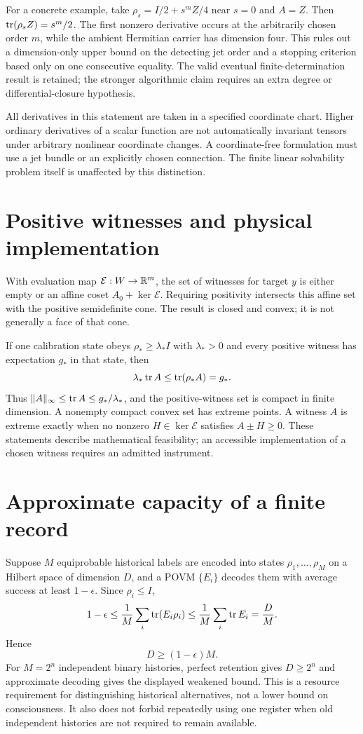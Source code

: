 For a concrete example, take $\rho_s=I/2+s^mZ/4$ near $s=0$ and $A=Z$. Then $\operatorname{tr}(\rho_sZ)=s^m/2$. The first nonzero derivative occurs at the arbitrarily chosen order $m$, while the ambient Hermitian carrier has dimension four. This rules out a dimension-only upper bound on the detecting jet order and a stopping criterion based only on one consecutive equality. The valid eventual finite-determination result is retained; the stronger algorithmic claim requires an extra degree or differential-closure hypothesis.

All derivatives in this statement are taken in a specified coordinate chart. Higher ordinary derivatives of a scalar function are not automatically invariant tensors under arbitrary nonlinear coordinate changes. A coordinate-free formulation must use a jet bundle or an explicitly chosen connection. The finite linear solvability problem itself is unaffected by this distinction.

\section{Positive witnesses and physical implementation}\label{section:witness:positive-witnesses-and-physical-implementation}
With evaluation map $\mathcal E:W\to\mathbb R^m$, the set of witnesses for target $y$ is either empty or an affine coset $A_0+\ker\mathcal E$. Requiring positivity intersects this affine set with the positive semidefinite cone. The result is closed and convex; it is not generally a face of that cone.

If one calibration state obeys $\rho_*\ge\lambda_*I$ with $\lambda_*>0$ and every positive witness has expectation $g_*$ in that state, then
\[
\lambda_*\operatorname{tr} A\le\operatorname{tr}(\rho_*A)=g_*.
\]
Thus $\lVert A\rVert_\infty\le\operatorname{tr} A\le g_*/\lambda_*$, and the positive-witness set is compact in finite dimension. A nonempty compact convex set has extreme points. A witness $A$ is extreme exactly when no nonzero $H\in\ker\mathcal E$ satisfies $A\pm H\ge0$. These statements describe mathematical feasibility; an accessible implementation of a chosen witness requires an admitted instrument.

\section{Approximate capacity of a finite record}\label{section:witness:approximate-capacity-of-a-finite-record}
Suppose $M$ equiprobable historical labels are encoded into states $\rho_1,\ldots,\rho_M$ on a Hilbert space of dimension $D$, and a POVM $\{E_i\}$ decodes them with average success at least $1-\epsilon$. Since $\rho_i\le I$,
\[
1-\epsilon\le\frac1M\sum_i\operatorname{tr}(E_i\rho_i)
\le\frac1M\sum_i\operatorname{tr} E_i=\frac DM.
\]
Hence
\[
D\ge(1-\epsilon)M.
\]
For $M=2^n$ independent binary histories, perfect retention gives $D\ge2^n$ and approximate decoding gives the displayed weakened bound. This is a resource requirement for distinguishing historical alternatives, not a lower bound on consciousness. It also does not forbid repeatedly using one register when old independent histories are not required to remain available.

